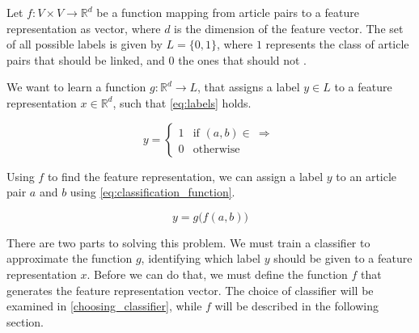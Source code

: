 
Let $f: V\times V \to \mathbb{R}^d$ be a function mapping from article pairs to a feature representation as vector, where $d$ is the dimension of the feature vector. The set of all possible labels is given by $L=\{0,1\}$, where $1$ represents the class of article pairs that should be linked, and $0$ the ones that should not .

We want to learn a function $g: \mathbb{R}^d \to L$, that assigns a label $y \in L$ to a feature representation $x \in \mathbb{R}^d$, such that \cref{eq:labels} holds.

\begin{equation}
\label{eq:labels}
    y=
    \begin{cases}
        1 & \text{if } (a,b) \in \  \Rightarrow\\
        0 & \text{otherwise}
    \end{cases}
\end{equation}

Using $f$ to find the feature representation, we can assign a label $y$ to an article pair $a$ and $b$ using \cref{eq:classification_function}.

\begin{equation}
\label{eq:classification_function}
  y = g\big(f(a,b)\big)
\end{equation}

There are two parts to solving this problem. We must train a classifier to approximate the function $g$, identifying which label $y$ should be given to a feature representation $x$. Before we can do that, we must define the function $f$ that generates the feature representation vector. The choice of classifier will be examined in \cref{choosing_classifier}, while $f$ will be described in the following section.




